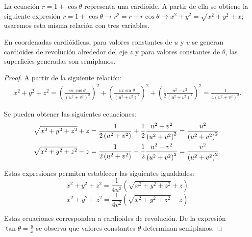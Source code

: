 La ecuación $r=1+\cos\theta$ representa una cardioide.
A partir de ella se obtiene la siguiente expresión
$r=1+\cos\theta \to r^2=r+r\cos\theta \to x^2+y^2=\sqrt{x^2+y^2}+x;$ %
usaremos esta misma relación con tres variables.

\begin{prop}
En coordenadas cardióidicas, para valores constantes de $u$ y $v$
se generan cardioides de revolución alrededor del eje $z$ y para valores constantes de
$\theta$, las superficies generadas son semiplanos.
\end{prop}

\enlargethispage*{\baselineskip}

\begin{proof}
A partir de la siguiente relación:
\begin{gather*}
x^2+y^2+z^2 = \left( \frac{uv\cos \theta}{\left( u^2+v^2\right) ^2} \right) ^2+\left( \frac{uv\sin \theta}{\left( u^2+v^2\right) ^2} \right) ^2+\left( \frac{1}{2}\frac{u^2-v^2}{\left(u^2+v^2\right) ^2}\right) ^2 = \frac{1}{4\left(u^2+v^2\right) ^2}.
\end{gather*}

Se pueden obtener las siguientes ecuaciones:
\begin{align*}
\sqrt{x^2+y^2+z^2}+z &= \frac{1}{2\left( u^2+v^2\right) }+\frac{1}{2}%
\frac{u^2-v^2}{\left( u^2+v^2\right) ^2}= \frac{u^2}{%
\left( u^2+v^2\right) ^2} \\
\sqrt{x^2+y^2+z^2}-z &= \frac{1}{2\left( u^2+v^2\right) }-\frac{1}{2}%
\frac{u^2-v^2}{\left( u^2+v^2\right) ^2}= \frac{v^2}{%
\left( u^2+v^2\right) ^2}.
\end{align*}

Estas expresiones permiten establecer las siguientes igualdades:
\[x^2+y^2+z^2=\frac{1}{4u^2}\left( \sqrt{x^2+y^2+z^2}+z\right)\]
\[x^2+y^2+z^2=\frac{1}{4v^2}\left( \sqrt{x^2+y^2+z^2}-z\right)\]

Estas ecuaciones corresponden a cardioides de revolución.
De la expresión $\tan \theta =\frac{y}{x}$ se observa que valores constantes $\theta$
determinan semiplanos.
\end{proof}

